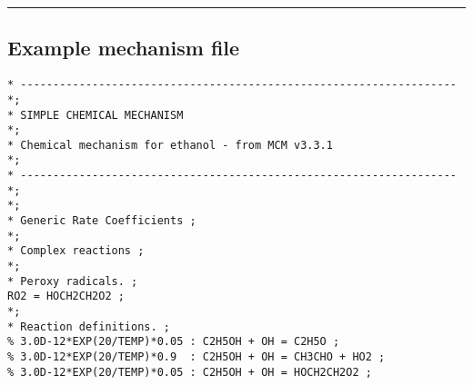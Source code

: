 \begin{center}\rule{0.5\linewidth}{\linethickness}\end{center}

\hypertarget{example-mechanism-file}{%
\subsection{Example mechanism file}\label{example-mechanism-file}}

\begin{verbatim}
* ------------------------------------------------------------------- *;
* SIMPLE CHEMICAL MECHANISM                                           *;
* Chemical mechanism for ethanol - from MCM v3.3.1                    *;
* ------------------------------------------------------------------- *;
*;
* Generic Rate Coefficients ;
*;
* Complex reactions ;
*;
* Peroxy radicals. ;
RO2 = HOCH2CH2O2 ;
*;
* Reaction definitions. ;
% 3.0D-12*EXP(20/TEMP)*0.05 : C2H5OH + OH = C2H5O ;
% 3.0D-12*EXP(20/TEMP)*0.9  : C2H5OH + OH = CH3CHO + HO2 ;
% 3.0D-12*EXP(20/TEMP)*0.05 : C2H5OH + OH = HOCH2CH2O2 ;
\end{verbatim}
